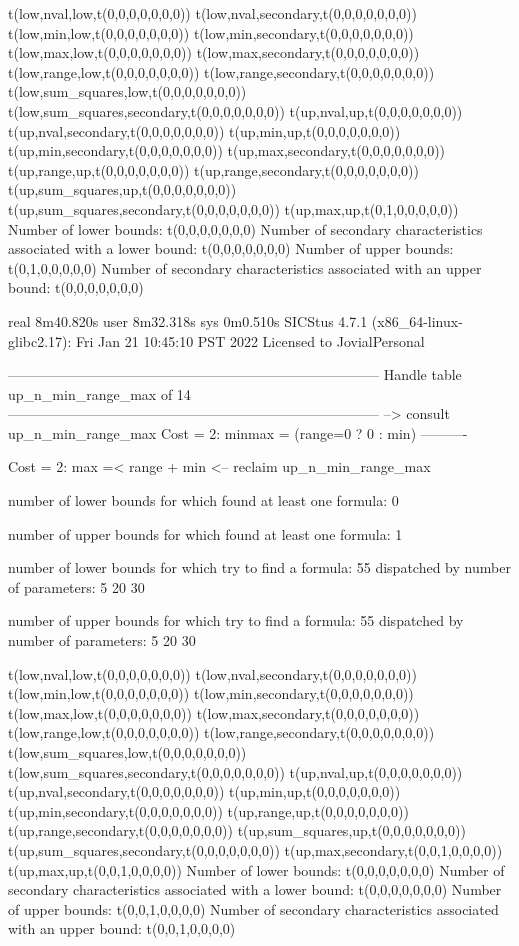 t(low,nval,low,t(0,0,0,0,0,0,0))
t(low,nval,secondary,t(0,0,0,0,0,0,0))
t(low,min,low,t(0,0,0,0,0,0,0))
t(low,min,secondary,t(0,0,0,0,0,0,0))
t(low,max,low,t(0,0,0,0,0,0,0))
t(low,max,secondary,t(0,0,0,0,0,0,0))
t(low,range,low,t(0,0,0,0,0,0,0))
t(low,range,secondary,t(0,0,0,0,0,0,0))
t(low,sum_squares,low,t(0,0,0,0,0,0,0))
t(low,sum_squares,secondary,t(0,0,0,0,0,0,0))
t(up,nval,up,t(0,0,0,0,0,0,0))
t(up,nval,secondary,t(0,0,0,0,0,0,0))
t(up,min,up,t(0,0,0,0,0,0,0))
t(up,min,secondary,t(0,0,0,0,0,0,0))
t(up,max,secondary,t(0,0,0,0,0,0,0))
t(up,range,up,t(0,0,0,0,0,0,0))
t(up,range,secondary,t(0,0,0,0,0,0,0))
t(up,sum_squares,up,t(0,0,0,0,0,0,0))
t(up,sum_squares,secondary,t(0,0,0,0,0,0,0))
t(up,max,up,t(0,1,0,0,0,0,0))
Number of lower bounds:                                             t(0,0,0,0,0,0,0)
Number of secondary characteristics associated with a lower bound:  t(0,0,0,0,0,0,0)
Number of upper bounds:                                             t(0,1,0,0,0,0,0)
Number of secondary characteristics associated with an upper bound: t(0,0,0,0,0,0,0)

real	8m40.820s
user	8m32.318s
sys	0m0.510s
SICStus 4.7.1 (x86_64-linux-glibc2.17): Fri Jan 21 10:45:10 PST 2022
Licensed to JovialPersonal


--------------------------------------------------------------------------------
Handle table up_n_min_range_max of 14
--------------------------------------------------------------------------------
--> consult up_n_min_range_max
Cost =  2:  minmax = (range=0 ? 0 : min)
----------

Cost =  2:  max =< range + min
<-- reclaim up_n_min_range_max

number of lower bounds for which found at least one formula: 0

number of upper bounds for which found at least one formula: 1

number of lower bounds for which try to find a formula: 55
dispatched by number of parameters: 5  20  30

number of upper bounds for which try to find a formula: 55
dispatched by number of parameters: 5  20  30

t(low,nval,low,t(0,0,0,0,0,0,0))
t(low,nval,secondary,t(0,0,0,0,0,0,0))
t(low,min,low,t(0,0,0,0,0,0,0))
t(low,min,secondary,t(0,0,0,0,0,0,0))
t(low,max,low,t(0,0,0,0,0,0,0))
t(low,max,secondary,t(0,0,0,0,0,0,0))
t(low,range,low,t(0,0,0,0,0,0,0))
t(low,range,secondary,t(0,0,0,0,0,0,0))
t(low,sum_squares,low,t(0,0,0,0,0,0,0))
t(low,sum_squares,secondary,t(0,0,0,0,0,0,0))
t(up,nval,up,t(0,0,0,0,0,0,0))
t(up,nval,secondary,t(0,0,0,0,0,0,0))
t(up,min,up,t(0,0,0,0,0,0,0))
t(up,min,secondary,t(0,0,0,0,0,0,0))
t(up,range,up,t(0,0,0,0,0,0,0))
t(up,range,secondary,t(0,0,0,0,0,0,0))
t(up,sum_squares,up,t(0,0,0,0,0,0,0))
t(up,sum_squares,secondary,t(0,0,0,0,0,0,0))
t(up,max,secondary,t(0,0,1,0,0,0,0))
t(up,max,up,t(0,0,1,0,0,0,0))
Number of lower bounds:                                             t(0,0,0,0,0,0,0)
Number of secondary characteristics associated with a lower bound:  t(0,0,0,0,0,0,0)
Number of upper bounds:                                             t(0,0,1,0,0,0,0)
Number of secondary characteristics associated with an upper bound: t(0,0,1,0,0,0,0)

